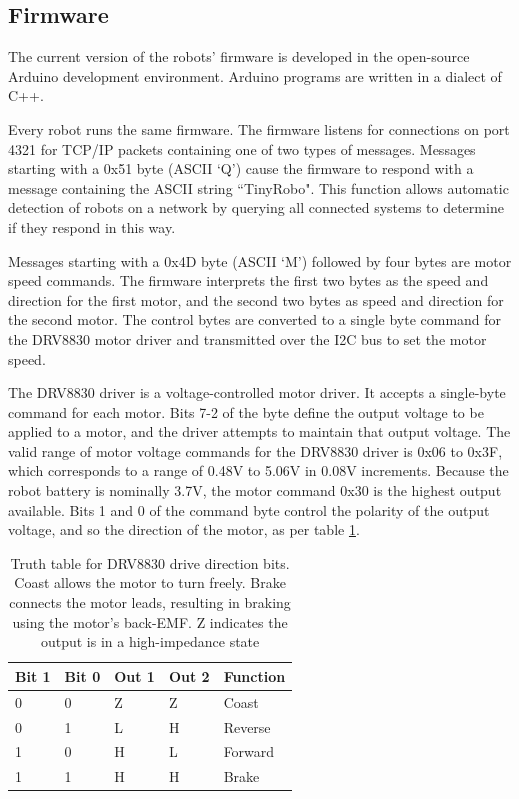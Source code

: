 \subsection {Firmware}

The current version of the robots' firmware is developed in the open-source Arduino development environment.
Arduino programs are written in a dialect of C++. 

Every robot runs the same firmware. 
The firmware listens for connections on port 4321 for TCP/IP packets containing one of two types of messages. 
Messages starting with a 0x51 byte (ASCII `Q') cause the firmware to respond with a message containing the ASCII string ``TinyRobo". 
This function allows automatic detection of robots on a network by querying all connected systems to determine if they respond in this way. 

Messages starting with a 0x4D byte (ASCII `M') followed by four bytes are motor speed commands.
The firmware interprets the first two bytes as the speed and direction for the first motor, and the second two bytes as speed and direction for the second motor.
The control bytes are converted to a single byte command for the DRV8830 motor driver and transmitted over the I2C bus to set the motor speed.

The DRV8830 driver is a voltage-controlled motor driver. 
It accepts a single-byte command for each motor. 
Bits 7-2 of the byte define the output voltage to be applied to a motor, and the driver attempts to maintain that output voltage.
The valid range of motor voltage commands for the DRV8830 driver is 0x06 to 0x3F, which corresponds to a range of 0.48V to 5.06V in 0.08V increments. 
Because the robot battery is nominally 3.7V, the motor command 0x30 is the highest output available. 
Bits 1 and 0 of the command byte control the polarity of the output voltage, and so the direction of the motor, as per table \ref{tab:DRV8830_truth}.

\begin{table}
	\begin{tabular}{l l l l l}
		Bit 1 & Bit 0 & Out 1 & Out 2 & Function\\
		\hline
		0 & 0 & Z & Z & Coast\\
		0 & 1 & L & H & Reverse\\
		1 & 0 & H & L & Forward\\
		1 & 1 & H & H & Brake\\				
	\end{tabular}
	
	\caption{Truth table for DRV8830 drive direction bits. Coast allows the motor to turn freely. Brake connects the motor leads, resulting in braking using the motor's back-EMF. Z indicates the output is in a high-impedance state}
	\label{tab:DRV8830_truth}
\end{table}

